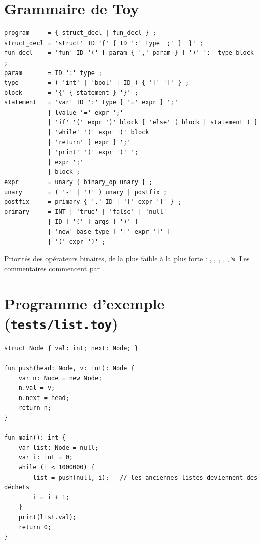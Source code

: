 \documentclass[11pt,a4paper]{article}
\newcommand{\code}[1]{\texttt{\detokenize{#1}}}
\begin{document}
\appendix
\section{Grammaire de Toy}

\begin{lstlisting}
program     = { struct_decl | fun_decl } ;
struct_decl = 'struct' ID '{' { ID ':' type ';' } '}' ;
fun_decl    = 'fun' ID '(' [ param { ',' param } ] ')' ':' type block ;
param       = ID ':' type ;
type        = ( 'int' | 'bool' | ID ) { '[' ']' } ;
block       = '{' { statement } '}' ;
statement   = 'var' ID ':' type [ '=' expr ] ';'
            | lvalue '=' expr ';'
            | 'if' '(' expr ')' block [ 'else' ( block | statement ) ]
            | 'while' '(' expr ')' block
            | 'return' [ expr ] ';'
            | 'print' '(' expr ')' ';'
            | expr ';'
            | block ;
expr        = unary { binary_op unary } ;
unary       = ( '-' | '!' ) unary | postfix ;
postfix     = primary { '.' ID | '[' expr ']' } ;
primary     = INT | 'true' | 'false' | 'null'
            | ID [ '(' [ args ] ')' ]
            | 'new' base_type [ '[' expr ']' ]
            | '(' expr ')' ;
\end{lstlisting}

Priorités des opérateurs binaires, de la plus faible à la plus forte : \code{||}, \code{&&}, \code{==} \code{!=}, \code{<} \code{<=} \code{>} \code{>=}, \code{+} \code{-}, \code{*} \code{/} \texttt{\%}. Les commentaires commencent par \code{//}.

\section{Programme d'exemple (\texttt{tests/list.toy})}

\begin{lstlisting}
struct Node { val: int; next: Node; }

fun push(head: Node, v: int): Node {
    var n: Node = new Node;
    n.val = v;
    n.next = head;
    return n;
}

fun main(): int {
    var list: Node = null;
    var i: int = 0;
    while (i < 1000000) {
        list = push(null, i);   // les anciennes listes deviennent des déchets
        i = i + 1;
    }
    print(list.val);
    return 0;
}
\end{lstlisting}
\end{document}

